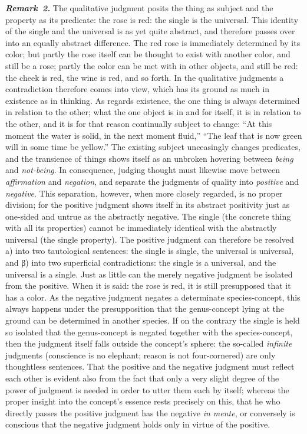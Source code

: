 \documentclass[12pt]{book}
\newcommand{\anm}[1]{\emph{\textbf{Remark~#1.}}}
\begin{document}
\anm{2} The qualitative judgment posits the thing as subject and the
property as its predicate: the rose is red: the single is the universal.
This identity of the single and the universal is as yet quite abstract, and
therefore passes over into an equally abstract difference. The red rose is
immediately determined by its color; but partly the rose itself can be
thought to exist with another color, and still be a rose; partly the color
can be met with in other objects, and still be red: the cheek is red, the
wine is red, and so forth. In the qualitative judgments a contradiction
therefore comes into view, which has its ground as much in existence as in
thinking. As regards existence, the one thing is always determined in
relation to the other; what the one object is in and for itself, it is in
relation to the other, and it is for that reason continually subject to
change:
``At this moment the water is solid, in the next moment fluid,'' ``The leaf
that is now green will in some time be yellow.'' The existing subject
unceasingly changes predicates, and the transience of things shows itself as
an unbroken hovering between \emph{being} and \emph{not-being}. In
consequence, judging thought must likewise move between \emph{affirmation}
and \emph{negation}, and separate the judgments of quality into
\emph{positive} and \emph{negative}. This separation, however, when more
closely regarded, is no proper division; for the positive judgment shows
itself in its abstract positivity just as one-sided and untrue as the
abstractly negative. The single (the concrete thing with all its properties)
cannot be immediately identical with the abstractly universal (the single
property). The positive judgment can therefore be resolved a) into two
tautological sentences: the single is single, the universal is universal,
and β) into two superficial contradictions: the single is a universal, and
the universal is a single. Just as little can the merely negative judgment
be isolated from the positive. When it is said: the rose is red, it is still
presupposed that it has a color. As the negative judgment negates a
determinate species-concept, this always happens under the presupposition
that the genus-concept lying at the ground can be determined in another
species. If on the contrary the single is held so isolated that the
genus-concept is negated together with the species-concept, then the
judgment itself falls outside the concept's sphere: the so-called
\emph{infinite} judgments (conscience is no elephant; reason is not
four-cornered) are only thoughtless sentences. That the positive and the
negative judgment must reflect each other is evident also from the fact that
only a very slight degree of the power of judgment is needed in order to
utter them each by itself; whereas the proper insight into the concept's
essence rests precisely on this, that he who directly passes the positive
judgment has the negative \textit{in mente}, or conversely is conscious that
the negative judgment holds only in virtue of the positive.
\end{document}
